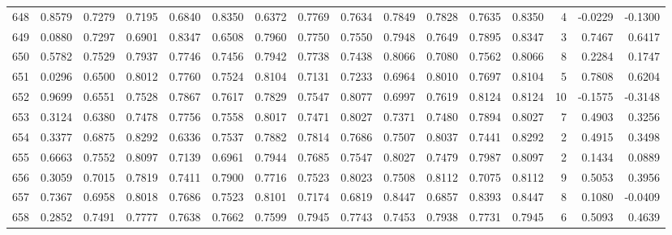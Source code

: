 \begin{tabular}{lrrrrrrrrrrrrrrr}
648 &      0.8579 &  0.7279 &  0.7195 &  0.6840 &  0.8350 &  0.6372 &  0.7769 &  0.7634 &  0.7849 &  0.7828 &   0.7635 &     0.8350 &      4 &                   -0.0229 &                    -0.1300 \\
649 &      0.0880 &  0.7297 &  0.6901 &  0.8347 &  0.6508 &  0.7960 &  0.7750 &  0.7550 &  0.7948 &  0.7649 &   0.7895 &     0.8347 &      3 &                    0.7467 &                     0.6417 \\
650 &      0.5782 &  0.7529 &  0.7937 &  0.7746 &  0.7456 &  0.7942 &  0.7738 &  0.7438 &  0.8066 &  0.7080 &   0.7562 &     0.8066 &      8 &                    0.2284 &                     0.1747 \\
651 &      0.0296 &  0.6500 &  0.8012 &  0.7760 &  0.7524 &  0.8104 &  0.7131 &  0.7233 &  0.6964 &  0.8010 &   0.7697 &     0.8104 &      5 &                    0.7808 &                     0.6204 \\
652 &      0.9699 &  0.6551 &  0.7528 &  0.7867 &  0.7617 &  0.7829 &  0.7547 &  0.8077 &  0.6997 &  0.7619 &   0.8124 &     0.8124 &     10 &                   -0.1575 &                    -0.3148 \\
653 &      0.3124 &  0.6380 &  0.7478 &  0.7756 &  0.7558 &  0.8017 &  0.7471 &  0.8027 &  0.7371 &  0.7480 &   0.7894 &     0.8027 &      7 &                    0.4903 &                     0.3256 \\
654 &      0.3377 &  0.6875 &  0.8292 &  0.6336 &  0.7537 &  0.7882 &  0.7814 &  0.7686 &  0.7507 &  0.8037 &   0.7441 &     0.8292 &      2 &                    0.4915 &                     0.3498 \\
655 &      0.6663 &  0.7552 &  0.8097 &  0.7139 &  0.6961 &  0.7944 &  0.7685 &  0.7547 &  0.8027 &  0.7479 &   0.7987 &     0.8097 &      2 &                    0.1434 &                     0.0889 \\
656 &      0.3059 &  0.7015 &  0.7819 &  0.7411 &  0.7900 &  0.7716 &  0.7523 &  0.8023 &  0.7508 &  0.8112 &   0.7075 &     0.8112 &      9 &                    0.5053 &                     0.3956 \\
657 &      0.7367 &  0.6958 &  0.8018 &  0.7686 &  0.7523 &  0.8101 &  0.7174 &  0.6819 &  0.8447 &  0.6857 &   0.8393 &     0.8447 &      8 &                    0.1080 &                    -0.0409 \\
658 &      0.2852 &  0.7491 &  0.7777 &  0.7638 &  0.7662 &  0.7599 &  0.7945 &  0.7743 &  0.7453 &  0.7938 &   0.7731 &     0.7945 &      6 &                    0.5093 &                     0.4639 \\

\end{tabular}
